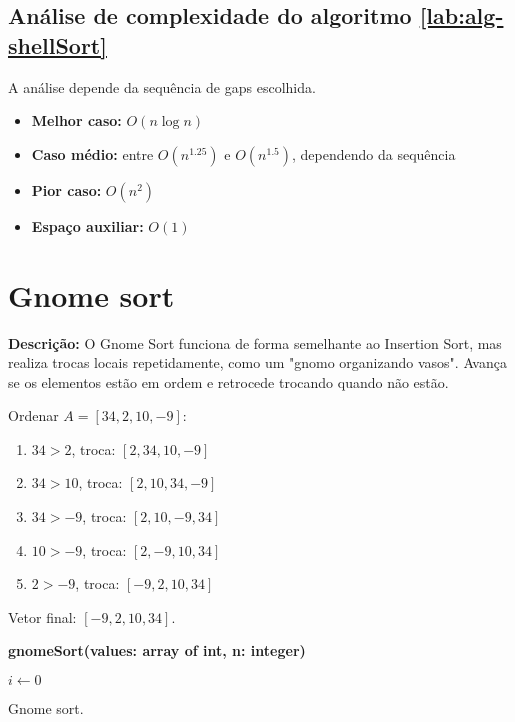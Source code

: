 \subsection{Análise de complexidade do algoritmo \ref{lab:alg-shellSort}}
A análise depende da sequência de gaps escolhida.
\begin{itemize}
    \item \textbf{Melhor caso:} $O(n \log n)$
    \item \textbf{Caso médio:} entre $O(n^{1.25})$ e $O(n^{1.5})$, dependendo da sequência
    \item \textbf{Pior caso:} $O(n^2)$
    \item \textbf{Espaço auxiliar:} $O(1)$
\end{itemize}


\section{Gnome sort}
\textbf{Descrição:} O Gnome Sort funciona de forma semelhante ao Insertion Sort, mas realiza trocas locais repetidamente, como um "gnomo organizando vasos". Avança se os elementos estão em ordem e retrocede trocando quando não estão.

\begin{exmp}
Ordenar $A = [34, 2, 10, -9]$:

\begin{enumerate}
    \item $34 > 2$, troca: $[2, 34, 10, -9]$
    \item $34 > 10$, troca: $[2, 10, 34, -9]$
    \item $34 > -9$, troca: $[2, 10, -9, 34]$
    \item $10 > -9$, troca: $[2, -9, 10, 34]$
    \item $2 > -9$, troca: $[-9, 2, 10, 34]$
\end{enumerate}
Vetor final: $[-9, 2, 10, 34]$.
\end{exmp}

\begin{center}
\begin{minipage}{.9\linewidth}
\begin{algorithm}[H]
\DontPrintSemicolon
\textbf{gnomeSort(values: array of int, n: integer)}

$i \gets 0$\;
\caption{Gnome sort.}
\label{lab:alg-gnomeSort}
\end{algorithm}
\end{minipage}
\end{center}

